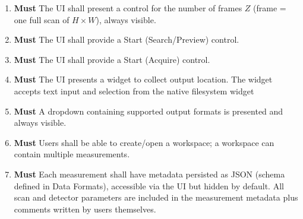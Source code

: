 \documentclass[10pt]{article}
\newcommand{\PriorityTag}[2]{%
    \colorbox{#2!25}{\footnotesize\textsf{\textbf{#1}}}\hspace{0.6em}}
\newcommand{\must}{\leavevmode\PriorityTag{Must}{green}}
\newcounter{reqgrp}[section] %
\newcounter{reqno}
\newcommand{\reqprefix}{GEN}
\newenvironment{requirements}[1]{%
    \renewcommand{\reqprefix}{#1}%
    \refstepcounter{reqgrp}%
    \setcounter{reqno}{0}%
    \begin{enumerate}[leftmargin=*]
    }{\end{enumerate}}
\begin{document}
\begin{requirements}{UI}
        \item \must {}
        {The UI shall present a control for the number of frames \(Z\) (frame = one full scan of \(H\times W\)), always visible.}

        \item \must {}
        {The UI shall provide a Start (Search/Preview) control.}

        \item \must {}
        {The UI shall provide a Start (Acquire) control.}

        \item \must {}
        {The UI presents a widget to collect output location. The widget accepts text input and selection from the native filesystem widget}

        \item \must {}
        {A dropdown containing supported output formats is presented and always visible.}

        \item \must {}
        {Users shall be able to create/open a workspace; a workspace can contain multiple measurements.}

        \item \must {}
        {Each measurement shall have metadata persisted as JSON (schema defined in Data Formats), accessible via the UI but hidden by default. All scan and detector parameters are included in the measurement metadata plus comments written by users themselves.}


\end{requirements}
\end{document}
